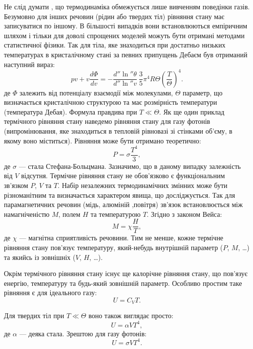 Не слід думати , що термодинаміка обмежується лише вивченням поведінки газів. Безумовно для інших речовин (рідин або твердих тіл) рівняння стану має записуватися по іншому. В більшості випадків вони встановлюються емпіричним шляхом і тільки для доволі спрощених моделей можуть бути отримані методами статистичної фізики. Так для тіла, яке знаходиться при достатньо низьких температурах в кристалічному стані за певних припущень Дебаєм був отриманий наступний вираз:
\begin{equation}\label{eq:Debay}
    pv + v \frac{d\Phi}{dv} = - \frac{d''\ln''\theta}{d''\ln''v}\ \frac35 \pi^4 R\Theta \left(\frac{T}{\Theta}\right)^4.
\end{equation}
де $\Phi$ залежить від потенціалу взаємодії між молекулами, $\Theta$ параметр, що визначається кристалічною структурою та має розмірність температури (температура Дебая). Формула правдива при $T \ll \Theta$. Як ще один приклад термічного рівняння стану наведемо рівняння стану для газу фотонів (випромінювання, яке знаходиться в тепловій рівновазі зі стінками об’єму, в якому воно міститься). Рівняння може бути отримано теоретично:
\begin{equation}\label{eq:Stef-Boltz}
    P = \sigma \frac{T^4}{3},
\end{equation}
де $\sigma$ --- стала Стефана-Больцмана. Зазначимо, що в даному випадку залежність від $V$ відсутня. Термічне рівняння стану не обов'язково є функціональним зв'язком $P$, $V$ та $T$. Набір незалежних термодинамічних змінних може бути різноманітним та визначається характером явища, що досліджується. Так для парамагнетичних речовин (мідь, алюміній ,повітря) зв'язок встановлюється між намагніченістю $M$, полем $H$ та температурою $T$. Згідно з законом Вейса:
\begin{equation}
    M = \chi \frac{H}{T},
\end{equation}
де $\chi$ --- магнітна сприятливість речовини. Тим не менше, кожне термічне рівняння стану пов’язує температуру, який-небудь внутрішній параметр ($P$, $M$, \ldots) та якийсь із зовнішніх ($V$, $H$, \ldots).

Окрім термічного рівняння стану існує ще калорічне рівняння стану, що пов’язує енергію, температуру та будь-який зовнішній параметр. Особливо простим таке рівняння є для ідеального газу:
\begin{equation*}
    U = C_V T.
\end{equation*}

Для твердих тіл при $T \ll \Theta$ воно також виглядає просто:
\begin{equation*}
    U = \alpha V T^4,
\end{equation*}
де $\alpha$ --- деяка стала.  Зрештою для газу фотонів:
\begin{equation*}
    U = \sigma V T^4.
\end{equation*}

